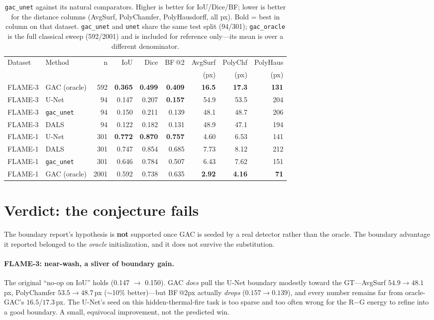 \documentclass[10pt]{article}
\begin{document}
\begin{table}[H]
\centering\small
\begin{tabular}{llrrrrrrr}
\toprule
Dataset & Method & n & IoU & Dice & BF\,@2 & AvgSurf & PolyChf & PolyHaus \\
& & & & & & (px) & (px) & (px) \\
\midrule
FLAME-3 & GAC (oracle)   & 592 & \textbf{0.365} & \textbf{0.499} & \textbf{0.409} & \textbf{16.5} & \textbf{17.3} & \textbf{131} \\
FLAME-3 & U-Net          & 94  & 0.147 & 0.207 & \textbf{0.157} & 54.9 & 53.5 & 204 \\
FLAME-3 & \texttt{gac\_unet} & 94  & 0.150 & 0.211 & 0.139 & 48.1 & 48.7 & 206 \\
FLAME-3 & DALS           & 94  & 0.122 & 0.182 & 0.131 & 48.9 & 47.1 & 194 \\
\midrule
FLAME-1 & U-Net          & 301  & \textbf{0.772} & \textbf{0.870} & \textbf{0.757} & 4.60 & 6.53 & 141 \\
FLAME-1 & DALS           & 301  & 0.747 & 0.854 & 0.685 & 7.73 & 8.12 & 212 \\
FLAME-1 & \texttt{gac\_unet} & 301  & 0.646 & 0.784 & 0.507 & 6.43 & 7.62 & 151 \\
FLAME-1 & GAC (oracle)   & 2001 & 0.592 & 0.738 & 0.635 & \textbf{2.92} & \textbf{4.16} & \textbf{71} \\
\bottomrule
\end{tabular}
\caption{\texttt{gac\_unet} against its natural comparators. Higher is better
for IoU/Dice/BF; lower is better for the distance columns (AvgSurf, PolyChamfer,
PolyHausdorff, all px). Bold = best in column on that dataset. \texttt{gac\_unet}
and \texttt{unet} share the same test split (94/301); \texttt{gac\_oracle} is the
full classical sweep (592/2001) and is included for reference only---its mean is
over a different denominator.}
\label{tab:gacunet}
\end{table}

\section{Verdict: the conjecture fails}

The boundary report's hypothesis is \textbf{not} supported once GAC is seeded by
a real detector rather than the oracle. The boundary advantage it reported
belonged to the \emph{oracle} initialization, and it does not survive the
substitution.

\paragraph{FLAME-3: near-wash, a sliver of boundary gain.} The original
``no-op on IoU'' holds (0.147 $\to$ 0.150). GAC \emph{does} pull the U-Net
boundary modestly toward the GT---AvgSurf $54.9\to48.1$\,px, PolyChamfer
$53.5\to48.7$\,px ($\sim$10\% better)---but BF\,@2px actually \emph{drops}
($0.157\to0.139$), and every number remains far from oracle-GAC's
$16.5$/$17.3$\,px. The U-Net's seed on this hidden-thermal-fire task is too
sparse and too often wrong for the R$-$G energy to refine into a good boundary.
A small, equivocal improvement, not the predicted win.
\end{document}
